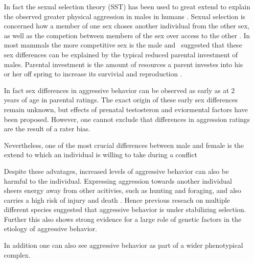 In fact the sexual selection theory (SST) has been used to great extend to explain the observed greater physical aggression in males in humans \cite{Archer2004}. 
Sexual selection is concerned how a member of one sex choses another individual from the other sex, as well as the competion between members of the sex over access to the other \cite{Darwin1859}.
In most mammals the more competitive sex is the male \cite{Archer2009} and~\cite{Trivers1972} suggested that these sex differences can be explained by the typical reduced parental investment of males.
Parental investment is the amount of resources a parent investes into his or her off spring to increase its survivial and reproduction \cite{Archer2009}.

In fact sex differences in aggressive behavior can be observed as early as at 2 years of age in parental ratings.
The exact origin of these early sex differences remain unknown, but effects of prenatal testosteron and eviormental factors have been proposed.
However, one cannot exclude that differences in aggression ratings are the result of a rater bias. 

Nevertheless, one of the most crucial differences between male and female is the extend to which an individual is willing to take during a conflict %



Despite these advatages, increased levels of aggressive behavior can also be harmful to the individual.
Expressing aggression towards another individual sheers energy away from other acitivies, such as hunting and foraging, and also carries a high risk of injury and death \cite{Packer1995}.  
Hence previous reseach on multiple different species suggested that aggressive behavior is under stabilizing selection.
Further this also shows strong evidence for a large role of genetic factors in the etiology of aggressive behavior. 


In addition one can also see aggressive behavior as part of a wider phenotypical complex. 


